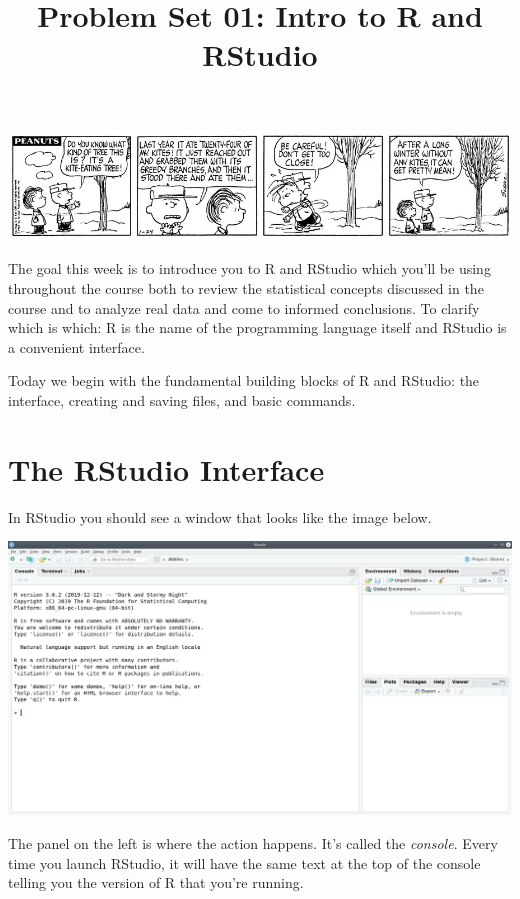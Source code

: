 \documentclass[
]{article}
\title{Problem Set 01: Intro to R and RStudio}
\author{}
\date{\vspace{-2.5em}}
\begin{document}
\maketitle

{
\setcounter{tocdepth}{2}
\tableofcontents
}
\includegraphics[width=1\textwidth,height=\textheight]{figures/cbrown.jpg}

The goal this week is to introduce you to R and RStudio which you'll be
using throughout the course both to review the statistical concepts
discussed in the course and to analyze real data and come to informed
conclusions. To clarify which is which: R is the name of the programming
language itself and RStudio is a convenient interface.

Today we begin with the fundamental building blocks of R and RStudio:
the interface, creating and saving files, and basic commands.

\hypertarget{the-rstudio-interface}{%
\section{The RStudio Interface}\label{the-rstudio-interface}}

In RStudio you should see a window that looks like the image below.

\includegraphics[width=1\textwidth,height=\textheight]{figures/Studio_desktop_opening.png}

The panel on the left is where the action happens. It's called the
\emph{console}. Every time you launch RStudio, it will have the same
text at the top of the console telling you the version of R that you're
running.
\end{document}
